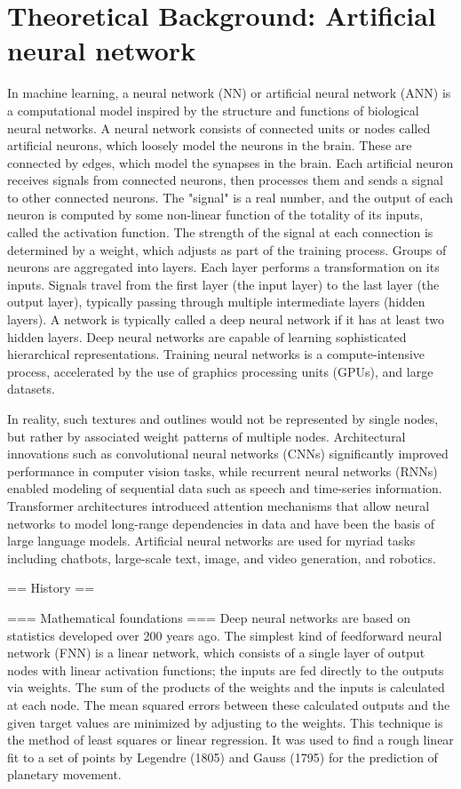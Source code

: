 \documentclass[12pt,a4paper]{report}
\begin{document}
\section{Theoretical Background: Artificial neural network}
In machine learning, a neural network (NN) or artificial neural network (ANN) is a computational model inspired by the structure and functions of biological neural networks.
A neural network consists of connected units or nodes called artificial neurons, which loosely model the neurons in the brain. These are connected by edges, which model the synapses in the brain. Each artificial neuron receives signals from connected neurons, then processes them and sends a signal to other connected neurons. The "signal" is a real number, and the output of each neuron is computed by some non-linear function of the totality of its inputs, called the activation function. The strength of the signal at each connection is determined by a weight, which adjusts as part of the training process.
Groups of neurons are aggregated into layers. Each layer performs a transformation on its inputs. Signals travel from the first layer (the input layer) to the last layer (the output layer), typically passing through multiple intermediate layers (hidden layers). A network is typically called a deep neural network if it has at least two hidden layers. Deep neural networks are capable of learning sophisticated hierarchical representations.
Training neural networks is a compute-intensive process, accelerated by  the use of graphics processing units (GPUs), and large datasets.

In reality, such textures and outlines would not be represented by single nodes, but rather by associated weight patterns of multiple nodes.
Architectural innovations such as convolutional neural networks (CNNs) significantly improved performance in computer vision tasks, while recurrent neural networks (RNNs) enabled modeling of sequential data such as speech and time-series information. Transformer architectures introduced attention mechanisms that allow neural networks to model long-range dependencies in data and have been the basis of large language models.
Artificial neural networks are used for myriad tasks including chatbots, large-scale text, image, and video generation, and robotics.


== History ==


=== Mathematical foundations ===
Deep neural networks are based on statistics developed over 200 years ago. The simplest kind of feedforward neural network (FNN) is a linear network, which consists of a single layer of output nodes with linear activation functions; the inputs are fed directly to the outputs via weights. The sum of the products of the weights and the inputs is calculated at each node. The mean squared errors between these calculated outputs and the given target values are minimized by adjusting to the weights. This technique is the method of least squares or linear regression. It was used to find a rough linear fit to a set of points by Legendre (1805) and Gauss (1795) for the prediction of planetary movement.
\end{document}
